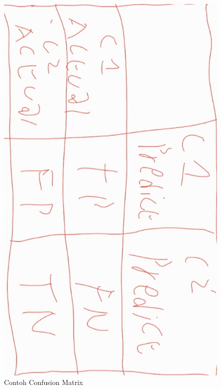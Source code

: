 \begin{enumerate}
\begin{figure}[H]
    \includegraphics[scale=0.2]{figures/1174035/chapter3/confusion.jpeg}
    \caption{Contoh Confusion Matrix}
    \label{contoh}
\end{figure}



\end{enumerate}
